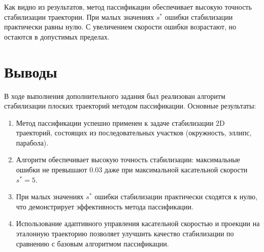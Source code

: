 \documentclass[a4paper,14pt,oneside,openany]{memoir}
\begin{document}
Как видно из результатов, метод пассификации обеспечивает высокую точность стабилизации траектории. При малых значениях $s^*$ ошибки стабилизации практически равны нулю. С увеличением скорости ошибки возрастают, но остаются в допустимых пределах.

\section{Выводы}

В ходе выполнения дополнительного задания был реализован алгоритм стабилизации плоских траекторий методом пассификации. Основные результаты:

\begin{enumerate}
\item Метод пассификации успешно применен к задаче стабилизации 2D траекторий, состоящих из последовательных участков (окружность, эллипс, парабола).

\item Алгоритм обеспечивает высокую точность стабилизации: максимальные ошибки не превышают 0.03 даже при максимальной касательной скорости $s^* = 5$.

\item При малых значениях $s^*$ ошибки стабилизации практически сходятся к нулю, что демонстрирует эффективность метода пассификации.

\item Использование адаптивного управления касательной скоростью и проекции на эталонную траекторию позволяет улучшить качество стабилизации по сравнению с базовым алгоритмом пассификации.
\end{enumerate}
\end{document}
